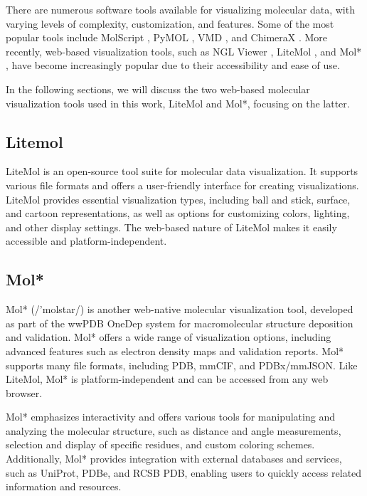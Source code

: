 \documentclass[
  digital,     %
  oneside,     %
  nosansbold,  %
  nocolorbold, %
  lof,         %
  lot,         %
]{fithesis4}
\begin{document}

There are numerous software tools available for visualizing molecular data, with varying levels of complexity, customization, and features. Some of the most popular tools include MolScript \cite{kraulis1991molscript}, PyMOL \cite{delano2002pymol}, VMD \cite{humphrey1996vmd}, and ChimeraX \cite{goddard2018ucsf}. More recently, web-based visualization tools, such as NGL Viewer \cite{rose2015ngl}, LiteMol \cite{sehnal2017litemol}, and Mol* \cite{sehnal2021molstar}, have become increasingly popular due to their accessibility and ease of use.

In the following sections, we will discuss the two web-based molecular visualization tools used in this work, LiteMol and Mol*, focusing on the latter.

\subsection{Litemol}
\label{subsection:litemol}

LiteMol is an open-source tool suite for molecular data visualization. It supports various file formats and offers a user-friendly interface for creating visualizations. LiteMol provides essential visualization types, including ball and stick, surface, and cartoon representations, as well as options for customizing colors, lighting, and other display settings. The web-based nature of LiteMol makes it easily accessible and platform-independent. \cite{sehnal2017litemol}

\subsection{Mol*}
\label{subsection:molstar}

Mol* (/'molstar/) is another web-native molecular visualization tool, developed as part of the wwPDB OneDep system for macromolecular structure deposition and validation. Mol* offers a wide range of visualization options, including advanced features such as electron density maps and validation reports. Mol* supports many file formats, including PDB, mmCIF, and PDBx/mmJSON. Like LiteMol, Mol* is platform-independent and can be accessed from any web browser. \cite{sehnal2021molstar}

Mol* emphasizes interactivity and offers various tools for manipulating and analyzing the molecular structure, such as distance and angle measurements, selection and display of specific residues, and custom coloring schemes. Additionally, Mol* provides integration with external databases and services, such as UniProt, PDBe, and RCSB PDB, enabling users to quickly access related information and resources.
\end{document}
